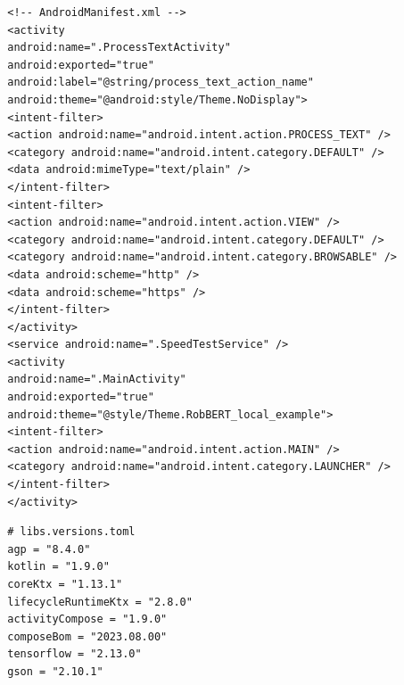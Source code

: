 \begin{listing}
    \begin{verbatim}
        <!-- AndroidManifest.xml -->
        <activity
        android:name=".ProcessTextActivity"
        android:exported="true"
        android:label="@string/process_text_action_name"
        android:theme="@android:style/Theme.NoDisplay">
        <intent-filter>
        <action android:name="android.intent.action.PROCESS_TEXT" />
        <category android:name="android.intent.category.DEFAULT" />
        <data android:mimeType="text/plain" />
        </intent-filter>
        <intent-filter>
        <action android:name="android.intent.action.VIEW" />
        <category android:name="android.intent.category.DEFAULT" />
        <category android:name="android.intent.category.BROWSABLE" />
        <data android:scheme="http" />
        <data android:scheme="https" />
        </intent-filter>
        </activity>
        <service android:name=".SpeedTestService" />
        <activity
        android:name=".MainActivity"
        android:exported="true"
        android:theme="@style/Theme.RobBERT_local_example">
        <intent-filter>
        <action android:name="android.intent.action.MAIN" />
        <category android:name="android.intent.category.LAUNCHER" />
        </intent-filter>
        </activity>
    \end{verbatim}
    \caption[AndroidManifest.xml]{Instellingen in het \texttt{AndroidManifest.xml} bestand die de activiteiten en \gls{services} binnen de applicatie definiëren, waaronder \texttt{ProcessTextActivity} en \texttt{SpeedTestService}.}
    \label{lst:android-manifest}
\end{listing}

\begin{listing}
    \begin{verbatim}
        # libs.versions.toml
        agp = "8.4.0"
        kotlin = "1.9.0"
        coreKtx = "1.13.1"
        lifecycleRuntimeKtx = "2.8.0"
        activityCompose = "1.9.0"
        composeBom = "2023.08.00"
        tensorflow = "2.13.0"
        gson = "2.10.1"
    \end{verbatim}
    \caption[\texttt{libs.versions.toml}]{De \texttt{libs.versions.toml} file bevat de versie-informatie voor de verschillende gebruikte bibliotheken binnen de Android-applicatie, waarmee compatibiliteit en consistentie worden gegarandeerd.}
    \label{lst:libs-versions}
\end{listing}

